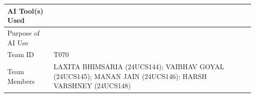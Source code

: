 \documentclass[11pt,a4paper]{article}
\begin{document}
\begin{tabularx}{\textwidth}{@{}l Y@{}}
\toprule
AI Tool(s) Used   & \\
\midrule
Purpose of AI Use & \\
\midrule
Team ID           & T070 \\
\midrule
Team Members      & LAXITA BHIMSARIA (24UCS144); VAIBHAV GOYAL (24UCS145);
                    MANAN JAIN (24UCS146); HARSH VARSHNEY (24UCS148) \\
\bottomrule
\end{tabularx}
\end{document}
